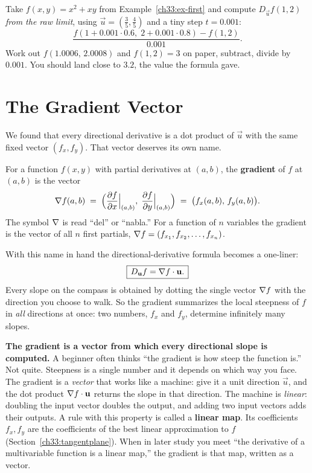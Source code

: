 \begin{labbox}
Take $f(x,y)=x^2+xy$ from Example~\ref{ch33:ex-first} and compute
$D_{\vec u}f(1,2)$ \emph{from the raw limit}, using $\vec u=(\tfrac35,\tfrac45)$
and a tiny step $t=0.001$:
\[
  \frac{f(1+0.001\cdot 0.6,\; 2+0.001\cdot 0.8)-f(1,2)}{0.001}.
\]
Work out $f(1.0006,\,2.0008)$ and $f(1,2)=3$ on paper, subtract, divide by
$0.001$. You should land close to $3.2$, the value the formula gave.
\end{labbox}

\section{The Gradient Vector}
\label{ch33:gradient}

We found that every directional derivative is a dot product of $\vec u$
with the same fixed vector $(f_x, f_y)$. That vector deserves its own name.

\begin{definition}
\label{ch33:def-gradient}
For a function $f(x,y)$ with partial derivatives at $(a,b)$, the \textbf{gradient}
of $f$ at $(a,b)$ is the vector
\[
  \nabla f(a,b) \;=\; \Big(\frac{\partial f}{\partial x}\Big|_{(a,b)},\; \frac{\partial f}{\partial y}\Big|_{(a,b)}\Big)
  \;=\; \big(f_x(a,b),\, f_y(a,b)\big).
\]
The symbol $\nabla$ is read ``del'' or ``nabla.'' For a function of $n$ variables
the gradient is the vector of all $n$ first partials,
$\nabla f = (f_{x_1}, f_{x_2}, \dots, f_{x_n})$.
\end{definition}

With this name in hand the directional-derivative formula becomes a one-liner:
\[
  \boxed{\,D_{\mathbf{u}} f = \nabla f \cdot \mathbf{u}.\,}
\]
Every slope on the compass is obtained by dotting the single vector $\nabla f$
with the direction you choose to walk. So the gradient summarizes the local
steepness of $f$ in \emph{all} directions at once: two numbers, $f_x$ and $f_y$,
determine infinitely many slopes.

\begin{happeningbox}
\textbf{The gradient is a vector from which every directional slope is computed.} A
beginner often thinks ``the gradient is how steep the function is.'' Not quite.
Steepness is a single number and it depends on which way you face. The gradient is
a \emph{vector} that works like a machine: give it a unit direction $\vec u$, and
the dot product $\nabla f\cdot\mathbf{u}$ returns the slope in that direction. The
machine is \emph{linear}: doubling the input vector doubles the output, and adding
two input vectors adds their outputs. A rule with this property is called a
\textbf{linear map}. Its coefficients $f_x, f_y$ are the coefficients of the best
linear approximation to $f$ (Section~\ref{ch33:tangentplane}). When in later study
you meet ``the derivative of a multivariable function is a linear map,'' the
gradient is that map, written as a vector.
\end{happeningbox}

